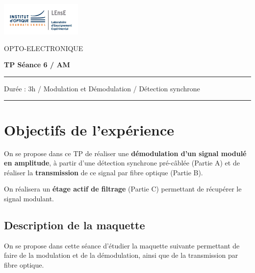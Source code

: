\documentclass[a4paper,11pt]{article}
\begin{document}
\newpage
\begin{minipage}[c]{.25\linewidth}
	\includegraphics[width=4cm]{images/LEnsE_IOGS.jpg}
\end{minipage} \hfill
\begin{minipage}[c]{.4\linewidth}

\begin{center}
\vspace{0.3cm}
{\Large OPTO-ELECTRONIQUE}

\medskip

\textbf{\Large TP Séance 6 / AM}

\end{center}
\end{minipage}\hfill

\begin{center}
\vspace{0.3cm}

\noindent \rule{\linewidth}{1pt}

Durée : 3h / Modulation et Démodulation / Détection synchrone

\vspace{-0.2cm}
\noindent \rule{\linewidth}{1pt}
\end{center}


\section*{Objectifs de l'expérience}

On se propose dans ce TP de réaliser une \textbf{démodulation d'un signal modulé en amplitude}, à partir d'une détection synchrone pré-câblée (Partie A) et de réaliser la \textbf{transmission} de ce signal par fibre optique (Partie B).

On réalisera un \textbf{étage actif de filtrage} (Partie C) permettant de récupérer le signal modulant.

\subsection*{Description de la maquette}

On se propose dans cette séance d'étudier la maquette suivante permettant de faire de la modulation et de la démodulation, ainsi que de la transmission par fibre optique.
\end{document}
